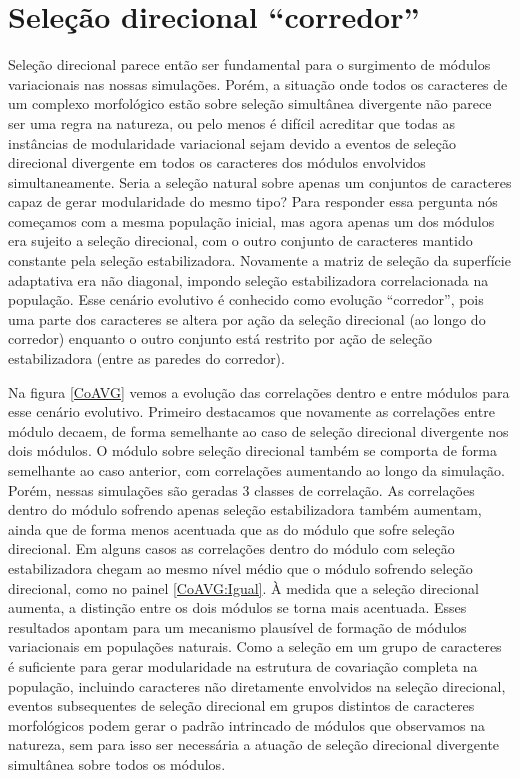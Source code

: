 \section{Seleção direcional ``corredor''}

Seleção direcional parece então ser fundamental para o surgimento de
módulos variacionais nas nossas simulações. 
Porém, a situação onde todos os caracteres de um complexo morfológico estão
sobre seleção simultânea divergente não parece ser uma regra na
natureza, ou pelo menos é difícil acreditar que todas as instâncias de
modularidade variacional sejam devido a eventos de seleção direcional
divergente em todos os caracteres dos módulos envolvidos simultaneamente. 
Seria a seleção natural sobre apenas um conjuntos de caracteres capaz de
gerar modularidade do mesmo tipo?
Para responder essa pergunta nós começamos com a mesma população
inicial, mas agora apenas um dos módulos era sujeito a seleção
direcional, com o outro conjunto de caracteres mantido constante pela
seleção estabilizadora. 
Novamente a matriz de seleção da superfície adaptativa era não diagonal,
impondo seleção estabilizadora correlacionada na população.
Esse cenário evolutivo é conhecido como evolução ``corredor'', pois uma
parte dos caracteres se altera por ação da seleção direcional (ao
longo do corredor) enquanto o outro conjunto está restrito por ação de
seleção estabilizadora (entre as paredes do corredor). 

Na figura \ref{CoAVG} vemos a evolução das correlações dentro e entre
módulos para esse cenário evolutivo. 
Primeiro destacamos que novamente as correlações entre módulo decaem, de
forma semelhante ao caso de seleção direcional divergente nos dois
módulos. 
O módulo sobre seleção direcional também se comporta de forma semelhante
ao caso anterior, com correlações aumentando ao longo da simulação. 
Porém, nessas simulações são geradas 3 classes de correlação. 
As correlações dentro do módulo sofrendo apenas seleção estabilizadora
também aumentam, ainda que de forma menos acentuada que as do módulo que
sofre seleção direcional. 
Em alguns casos as correlações dentro do módulo com seleção
estabilizadora chegam ao mesmo nível médio que o módulo sofrendo seleção
direcional, como no painel \ref{CoAVG:Igual}. 
À medida que a seleção direcional aumenta, a distinção entre os dois
módulos se torna mais acentuada. 
Esses resultados apontam para um mecanismo plausível de formação de
módulos variacionais em populações naturais. 
Como a seleção em um grupo de caracteres é suficiente para gerar
modularidade na estrutura de covariação completa na população, incluindo
caracteres não diretamente envolvidos na seleção direcional, eventos
subsequentes de seleção direcional em grupos distintos de caracteres
morfológicos podem gerar o padrão intrincado de módulos que observamos na
natureza, sem para isso ser necessária a atuação de seleção direcional
divergente simultânea sobre todos os módulos. 

